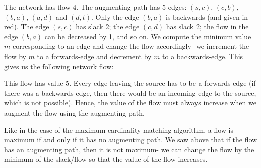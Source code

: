\documentclass[a4paper, openany]{memoir}
\begin{document}
    \noindent The network has flow 4. The augmenting path has 5 edges: $(s, c)$, $(c, b)$, $(b, a)$, $(a, d)$ and $(d, t)$. Only the edge $(b, a)$ is backwards (and given in red). The edge $(s, c)$ has slack 2; the edge $(c, d)$ has slack 2; the flow in the edge $(b, a)$ can be decreased by 1, and so on. We compute the minimum value $m$ corresponding to an edge and change the flow accordingly- we increment the flow by $m$ to a forwards-edge and decrement by $m$ to a backwards-edge. This gives us the following network flow:
    \begin{figure}[H]
        \centering
    \end{figure}
    \noindent This flow has value 5. Every edge leaving the source has to be a forwards-edge (if there was a backwards-edge, then there would be an incoming edge to the source, which is not possible). Hence, the value of the flow must always increase when we augment the flow using the augmenting path.

    Like in the case of the maximum cardinality matching algorithm, a flow is maximum if and only if it has no augmenting path. We saw above that if the flow has an augmenting path, then it is not maximum- we can change the flow by the minimum of the slack/flow so that the value of the flow increases.
\end{document}
